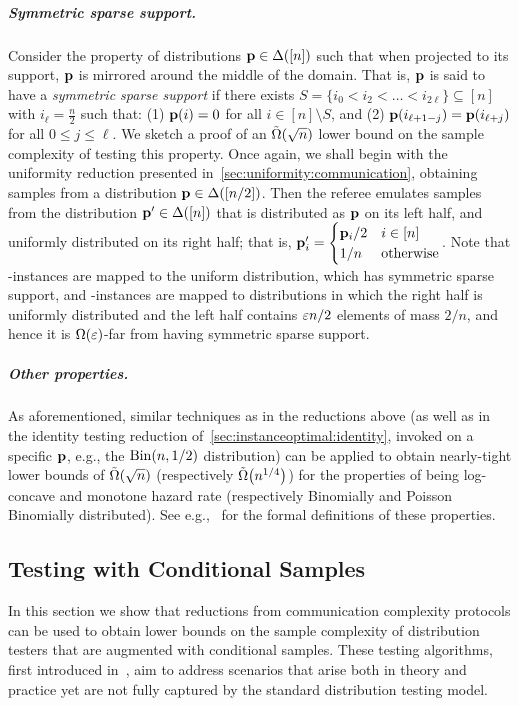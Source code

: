 \subparagraph{Symmetric sparse support.} Consider the property of distributions $\mathbf{p}\in\Delta\!\left([n]\right)$ such that when projected to its support, $\mathbf{p}$ is mirrored around the middle of the domain. That is, $\mathbf{p}$ is said to have a \emph{symmetric sparse support} if there exists $S=\{i_0 < i_2 < \dots< i_{2\ell}\}\subseteq [n]$ with $i_\ell = \frac{n}{2}$ such that: (1) $\mathbf{p}(i)=0$ for all $i\in[n]\setminus S$, and (2) $\mathbf{p}(i_{\ell+1-j}) = \mathbf{p}(i_{\ell+j})$ for all $0\leq j \leq \ell$. We sketch a proof of an $\tildeOmega{\sqrt{n}}$ lower bound on the sample complexity of testing this property. Once again, we shall begin with the uniformity reduction presented in~\cref{sec:uniformity:communication}, obtaining samples from a distribution $\mathbf{p} \in \Delta\!\left([n/2]\right)$. Then the referee emulates samples from the distribution $\mathbf{p}'\in\Delta\!\left([n]\right)$ that is distributed as $\mathbf{p}$ on its left half, and uniformly distributed on its right half; that is, $\mathbf{p}'_i = \begin{cases}
	\mathbf{p}_i/2 & i\in[n] \\
	1/n & \text{otherwise}
 \end{cases}$.
 Note that \yes-instances are mapped to the uniform distribution, which has symmetric sparse support, and \no-instances are mapped to distributions in which the right half is uniformly distributed and the left half contains $\varepsilon n/2$ elements of mass $2/n$, and hence it is $\bigOmega{\eps}$-far from having symmetric sparse support.
 
\subparagraph{Other properties.} As aforementioned, similar techniques as in the reductions above (as well as in the identity testing reduction of~\cref{sec:instanceoptimal:identity}, invoked on a specific $\mathbf{p}$, e.g., the $\operatorname{Bin}\!\left( n, 1/2 \right)$ distribution) can be applied to obtain nearly-tight lower bounds of $\tildeOmega{\sqrt{n}}$ (respectively $\tildeOmega{n^{1/4}}$) for the properties of being log-concave and monotone hazard rate (respectively Binomially and Poisson Binomially distributed). See e.g.,~\cite{CDGR:16} for the formal definitions of these properties.
 
\subsection{Testing with Conditional Samples}\label{sec:extensions}



In this section we show that reductions from communication complexity protocols can be used to obtain lower bounds on the sample complexity of distribution testers that are augmented with conditional samples. These testing algorithms, first introduced in~\cite{CFGM:13,CRS:14}, aim to address scenarios that arise both in theory and practice yet are not fully captured by the standard distribution testing model.

